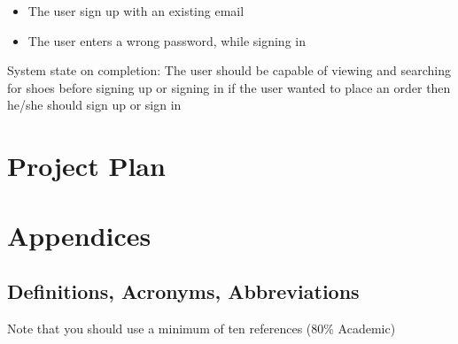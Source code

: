 \documentclass[12pt]{article}
\begin{document}
\begin{itemize}
\item The user sign up with an existing email
\item The user enters a wrong password, while signing in
\end{itemize}
System state on completion: The user should be capable of viewing and searching for shoes before signing up or signing in if the user wanted to place an order then he/she should sign up or sign in 
\section{Project Plan}


\section{Appendices}

\subsection{Definitions, Acronyms, Abbreviations}


\printbibliography
Note that you should use a minimum of ten references (80\% Academic)
 


\end{document}
